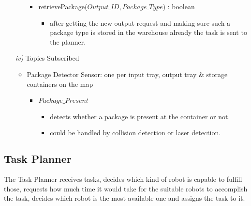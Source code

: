 \documentclass{article}
\begin{document}
\begin{enumerate}
\begin{itemize}
\begin{itemize}
\begin{itemize}
			\end{itemize}
			\item retrievePackage($Output\_ID, Package\_Type$) : boolean
			\begin{itemize}
				\item after getting the new output request and making sure such a package type is stored in the warehouse already the task is sent to the planner.
			\end{itemize}
		\end{itemize}
	\end{itemize}
	\item[\textit{iv)}] Topics Subscribed
	\begin{itemize}
		\item Package Detector Sensor: one per input tray, output tray \& storage containers on the map
		\begin{itemize}
			\item $Package\_Present$
			\begin{itemize}
				\item detects whether a package is present at the container or not.
				\item could be handled by collision detection or laser detection.
			\end{itemize}
		\end{itemize}
	\end{itemize}
\end{enumerate}

\subsection{Task Planner}
The Task Planner receives tasks, decides which kind of robot is capable to fulfill those, requests how much time it would take for the suitable robots to accomplish the task, decides which robot is the most available one and assigns the task to it.
\end{document}
